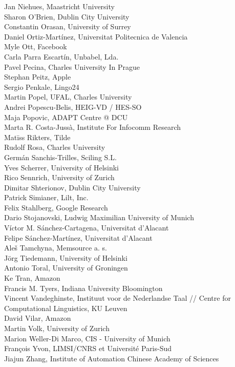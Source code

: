 \documentclass[a4paper,11pt,twoside]{book}
\begin{document}
\noindent Jan Niehues, Maastricht University\\
\noindent Sharon O'Brien, Dublin City University\\
\noindent Constantin Orasan, University of Surrey\\
\noindent Daniel Ortiz-Martínez, Universitat Politecnica de Valencia\\
\noindent Myle Ott, Facebook\\
\noindent Carla Parra Escartín, Unbabel, Lda.\\
\noindent Pavel Pecina, Charles University In Prague\\
\noindent Stephan Peitz, Apple\\
\noindent Sergio Penkale, Lingo24\\
\noindent Martin Popel, UFAL, Charles University\\
\noindent Andrei Popescu-Belis, HEIG-VD / HES-SO\\
\noindent Maja Popovic, ADAPT Centre @ DCU\\
\noindent Marta R. Costa-Jussà, Institute For Infocomm Research\\
\noindent Matīss Rikters, Tilde\\
\noindent Rudolf Rosa, Charles University\\
\noindent Germán Sanchis-Trilles, Sciling S.L.\\
\noindent Yves Scherrer, University of Helsinki\\
\noindent Rico Sennrich, University of Zurich\\
\noindent Dimitar Shterionov, Dublin City University\\
\noindent Patrick Simianer, Lilt, Inc.\\
\noindent Felix Stahlberg, Google Research\\
\noindent Dario Stojanovski, Ludwig Maximilian University of Munich\\
\noindent Víctor M. Sánchez-Cartagena, Universitat d'Alacant\\
\noindent Felipe Sánchez-Martínez, Universitat d'Alacant\\
\noindent Aleš Tamchyna, Memsource a. s.\\
\noindent Jörg Tiedemann, University of Helsinki\\
\noindent Antonio Toral, University of Groningen\\
\noindent Ke Tran, Amazon\\
\noindent Francis M. Tyers, Indiana University Bloomington\\
\noindent Vincent Vandeghinste, Instituut voor de Nederlandse Taal // Centre for Computational Linguistics, KU Leuven\\
\noindent David Vilar, Amazon\\
\noindent Martin Volk, University of Zurich\\
\noindent Marion Weller-Di Marco, CIS - University of Munich\\
\noindent François Yvon, LIMSI/CNRS et Université Paris-Sud\\
\noindent Jiajun Zhang, Institute of Automation Chinese Academy of Sciences
\end{document}
